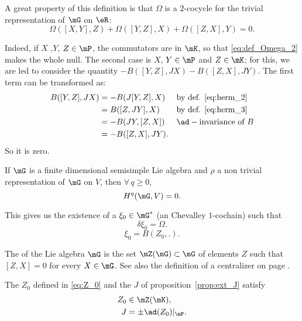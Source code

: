 A great property of this definition is that $\Omega$ is a $2$-cocycle for the trivial representation of $\mG$ on $\eR$:
\[
	\Omega([X,Y],Z)+\Omega([Y,Z],X)+\Omega([Z,X],Y)=0.
\]

Indeed, if $X$ ,$Y$, $Z\in\mP$, the commutators are in $\mK$, so that \eqref{eq:def_Omega_2} makes the whole null. The second case is $X$, $Y\in\mP$ and $Z\in\mK$; for this, we are led to consider the quantity $-B( [Y,Z],JX )-B([Z,X],JY)$. The first term can be transformed as:
\[
	\begin{aligned}
		B([Y,Z],JX) & =-B(J[Y,Z],X)  &  & \text{by def. \eqref{eq:herm_2} } \\
		            & =B([Z,JY],X)   &  & \text{by def.  \eqref{eq:herm_3}} \\
		            & =-B(JY,[Z,X])  &  & \ad-\text{invariance of } B       \\
		            & =-B([Z,X],JY).
	\end{aligned}
\]
So it is zero.

\begin{lemma}
	If $\mG$ is  a finite dimensional semisimple  Lie algebra and $\rho$ a non trivial representation of $\mG$ on $V$, then $\forall\,q\geq 0$,
	\[
		H^q(\mG,V)=0.
	\]
\end{lemma}

This gives us the existence of a $\xi_0\in\mG^*$ (an Chevalley $1$-cochain) such that
\[
	\delta\xi_0=\Omega.
\]
\begin{equation}\label{eq:Z_0}
	\xi_0=B(Z_0,.).
\end{equation}

\begin{definition}
	The  of the Lie algebra $\mG$ is the set $\mZ(\mG)\subset\mG$ of elements $Z$ such that $[Z,X]=0$ for every $X\in\mG$. See also the definition of a centralizer on page \pageref{PgDefCentralisateur}.
\end{definition}

\begin{proposition}
	The $Z_0$ defined in \eqref{eq:Z_0} and the $J$ of proposition~\ref{prop:ext_J} satisfy
	\begin{subequations}
		\begin{align}
			Z_0 & \in\mZ(\mK),         \\
			J   & =\pm\ad(Z_0)|_{\mP}.
		\end{align}
	\end{subequations}


\end{proposition}

